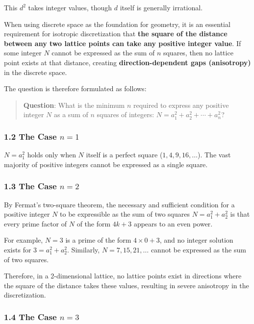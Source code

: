 \documentclass[a4paper,11pt]{article}
\begin{document}
This \(d^2\) takes integer values, though \(d\) itself is generally
irrational.

When using discrete space as the foundation for geometry, it is an
essential requirement for isotropic discretization that \textbf{the
square of the distance between any two lattice points can take any
positive integer value}. If some integer \(N\) cannot be expressed as
the sum of \(n\) squares, then no lattice point exists at that distance,
creating \textbf{direction-dependent gaps (anisotropy)} in the discrete
space.

The question is therefore formulated as follows:

\begin{quote}
\textbf{Question}: What is the minimum \(n\) required to express any
positive integer \(N\) as a sum of \(n\) squares of integers:
\(N = a_1^2 + a_2^2 + \cdots + a_n^2\)?
\end{quote}

\subsubsection{\texorpdfstring{1.2 The Case
\(n = 1\)}{1.2 The Case n = 1}}\label{the-case-n-1}

\(N = a_1^2\) holds only when \(N\) itself is a perfect square
(\(1, 4, 9, 16, \ldots\)). The vast majority of positive integers cannot
be expressed as a single square.

\subsubsection{\texorpdfstring{1.3 The Case
\(n = 2\)}{1.3 The Case n = 2}}\label{the-case-n-2}

By Fermat's two-square theorem, the necessary and sufficient condition
for a positive integer \(N\) to be expressible as the sum of two squares
\(N = a_1^2 + a_2^2\) is that every prime factor of \(N\) of the form
\(4k + 3\) appears to an even power.

For example, \(N = 3\) is a prime of the form \(4 \times 0 + 3\), and no
integer solution exists for \(3 = a_1^2 + a_2^2\). Similarly,
\(N = 7, 15, 21, \ldots\) cannot be expressed as the sum of two squares.

Therefore, in a 2-dimensional lattice, no lattice points exist in
directions where the square of the distance takes these values,
resulting in severe anisotropy in the discretization.

\subsubsection{\texorpdfstring{1.4 The Case
\(n = 3\)}{1.4 The Case n = 3}}\label{the-case-n-3}
\end{document}
